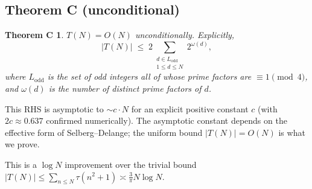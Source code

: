 \documentclass[11pt]{article}
\newtheorem*{theoremC}{Theorem C}
\begin{document}
\subsection*{Theorem C (unconditional)}

\begin{theoremC}
$T(N) = O(N)$ unconditionally. Explicitly,
\[
|T(N)| \;\le\; 2 \sum_{\substack{d \in L_{\mathrm{odd}} \\ 1 \le d \le N}}
2^{\omega(d)},
\]
where $L_{\mathrm{odd}}$ is the set of odd integers all of whose prime factors
are $\equiv 1 \pmod 4$, and $\omega(d)$ is the number of distinct prime
factors of $d$.
\end{theoremC}

This RHS is asymptotic to $\sim c \cdot N$ for an explicit positive constant $c$
(with $2c \approx 0.637$ confirmed numerically). The asymptotic constant
depends on the effective form of Selberg--Delange; the uniform bound
$|T(N)| = O(N)$ is what we prove.

This is a $\log N$ improvement over the trivial bound
$|T(N)| \le \sum_{n \le N} \tau(n^2+1) \asymp \tfrac{3}{\pi} N \log N$.
\end{document}
